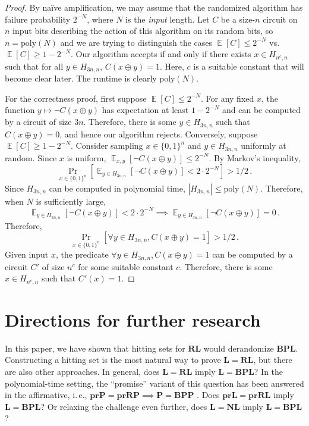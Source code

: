 \documentclass[11pt]{article}
\numberwithin{equation}{section}
\theoremstyle{definition}
\theoremstyle{plain}
\newcommand{\ie}{i.\,e.}
\DeclareMathOperator*{\ExpVal}{\mathbb{E}}
\begin{document}
\begin{proof}
By na{\"i}ve amplification, we may assume that the randomized algorithm has failure probability $2^{-N}$, where $N$ is the \emph{input} length. Let $C$ be a size-$n$ circuit on $n$ input bits describing the action of this algorithm on its random bits, so $n = \text{poly}(N)$ and we are trying to distinguish the cases $\ExpVal[C] \leq 2^{-N}$ vs.\ $\ExpVal[C] \geq 1 - 2^{-N}$. Our algorithm accepts if and only if there exists $x \in H_{n^c, n}$ such that for all $y \in H_{3n, n}$, $C(x \oplus y) = 1$. Here, $c$ is a suitable constant that will become clear later. The runtime is clearly $\text{poly}(N)$.

For the correctness proof, first suppose $\ExpVal[C] \leq 2^{-N}$. For any fixed $x$, the function $y \mapsto \neg C(x \oplus y)$ has expectation at least $1 - 2^{-N}$ and can be computed by a circuit of size $3n$. Therefore, there is some $y \in H_{3n, n}$ such that $C(x \oplus y) = 0$, and hence our algorithm rejects. Conversely, suppose $\ExpVal[C] \geq 1 - 2^{-N}$. Consider sampling $x \in \{0, 1\}^n$ and $y \in H_{3n, n}$ uniformly at random. Since $x$ is uniform, $\ExpVal_{x, y}[\neg C(x \oplus y)] \leq 2^{-N}$. By Markov's inequality,
$$
\Pr_{x \in \{0, 1\}^n}\left[\ExpVal_{y \in H_{3n, n}}[\neg C(x \oplus y)] < 2 \cdot 2^{-N}\right] > 1/2\,.
$$
Since $H_{3n, n}$ can be computed in polynomial time, $|H_{3n, n}| \leq \text{poly}(N)$. Therefore, when $N$ is sufficiently large,
$$
\ExpVal_{y \in H_{3n, n}}[\neg C(x \oplus y)] < 2 \cdot 2^{-N} \implies \ExpVal_{y \in H_{3n, n}}[\neg C(x \oplus y)] = 0\,.
$$
Therefore,
$$
\Pr_{x \in \{0, 1\}^n}\left[ \forall y \in H_{3n, n}, C(x \oplus y) = 1 \right] > 1/2\,.
$$
Given input $x$, the predicate $\forall y \in H_{3n, n}, C(x \oplus y) = 1$ can be computed by a circuit $C'$ of size $n^c$ for some suitable constant $c$. Therefore, there is some $x \in H_{n^c, n}$ such that $C'(x) = 1$.
\end{proof}

\section{Directions for further research}

In this paper, we have shown that hitting sets for $\mathbf{RL}$ would derandomize $\mathbf{BPL}$. Constructing a hitting set is the most natural way to prove $\mathbf{L} = \mathbf{RL}$, but there are also other approaches. In general, does $\mathbf{L} = \mathbf{RL}$ imply $\mathbf{L}= \mathbf{BPL}$? In the polynomial-time setting, the ``promise'' variant of this question has been answered in the affirmative, \ie, $\mathbf{prP} = \mathbf{prRP} \implies \mathbf{P} = \mathbf{BPP}$ \cite{BF99}. Does $\mathbf{prL} = \mathbf{prRL}$ imply $\mathbf{L}= \mathbf{BPL}$? Or relaxing the challenge even further, does $\mathbf{L} = \mathbf{NL}$ imply $\mathbf{L}= \mathbf{BPL}$?
\end{document}

